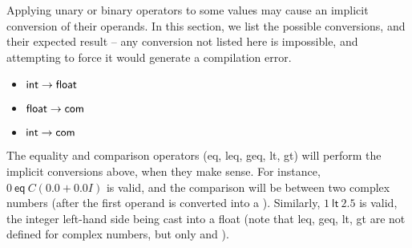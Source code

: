 Applying unary or binary operators to some values may cause an implicit conversion of their operands. In this section, we list the possible conversions, and their expected result -- any conversion not listed here is impossible, and attempting to force it would generate a compilation error.

\begin{itemize}
  \item $\textsf{int}\to\textsf{float}$
  \item $\textsf{float}\to\textsf{com}$
  \item $\textsf{int}\to\textsf{com}$
\end{itemize}
The equality and comparison operators (\textsf{eq}, \textsf{leq}, \textsf{geq}, \textsf{lt}, \textsf{gt}) will perform the implicit conversions above, when they make sense. For instance, $0\ \textsf{eq} \ C(0.0+0.0I)$ is valid, and the comparison will be between two complex numbers (after the first operand is converted into a \complex). Similarly, $1\ \textsf{lt}\ 2.5$ is valid, the integer left-hand side being cast into a float (note that \textsf{leq}, \textsf{geq}, \textsf{lt}, \textsf{gt} are not defined for complex numbers, but only \integ and \float).
